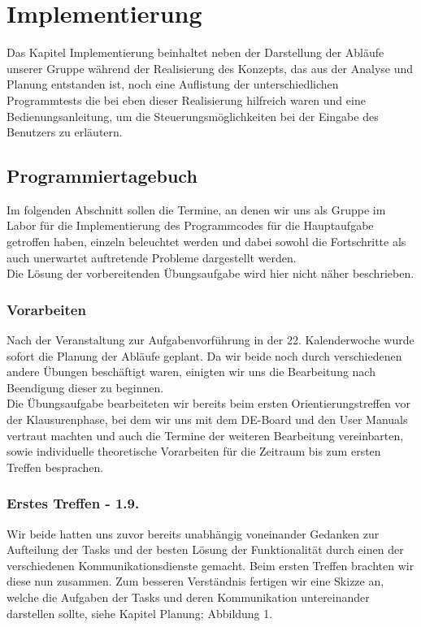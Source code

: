\chapter{Implementierung}

Das Kapitel Implementierung beinhaltet neben der Darstellung der Abläufe unserer Gruppe während der Realisierung des Konzepts, das aus der Analyse und Planung entstanden ist, noch eine Auflistung der unterschiedlichen Programmtests die bei eben dieser Realisierung hilfreich waren und eine Bedienungsanleitung, um die Steuerungsmöglichkeiten bei der Eingabe des Benutzers zu erläutern.

\section{Programmiertagebuch}

Im folgenden Abschnitt sollen die Termine, an denen wir uns als Gruppe im Labor für die Implementierung des Programmcodes für die Hauptaufgabe getroffen haben, einzeln beleuchtet werden und dabei sowohl die Fortschritte als auch unerwartet auftretende Probleme dargestellt werden.\\
Die Lösung der vorbereitenden Übungsaufgabe wird hier nicht näher beschrieben.

\subsection{Vorarbeiten} 

Nach der Veranstaltung zur Aufgabenvorführung in der 22. Kalenderwoche wurde sofort die Planung der Abläufe geplant. Da wir beide noch durch verschiedenen andere Übungen beschäftigt waren, einigten wir uns die Bearbeitung nach Beendigung dieser zu beginnen.\\
Die Übungsaufgabe bearbeiteten wir bereits beim ersten Orientierungstreffen vor der Klausurenphase, bei dem wir uns mit dem DE-Board und den User Manuals vertraut machten und auch die Termine der weiteren Bearbeitung vereinbarten, sowie individuelle theoretische Vorarbeiten für die Zeitraum bis zum ersten Treffen besprachen. 

\subsection{Erstes Treffen - 1.9.}

Wir beide hatten uns zuvor bereits unabhängig voneinander Gedanken zur Aufteilung der Tasks und der besten Lösung der Funktionalität durch einen der verschiedenen Kommunikationsdienste gemacht. Beim ersten Treffen brachten wir diese nun zusammen. Zum besseren Verständnis fertigen wir eine Skizze an, welche die Aufgaben der Tasks und deren Kommunikation untereinander darstellen sollte, siehe Kapitel Planung; Abbildung 1.\\

